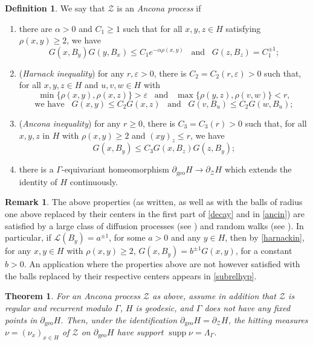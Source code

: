 \documentclass[12pt,a4paper]{amsart}
\newcounter{alph}
\numberwithin{equation}{section}
\newtheorem{thm}[equation]{Theorem}
\theoremstyle{definition}
\newtheorem{dfn}[equation]{Definition}
\newtheorem{rem}[equation]{Remark}
\DeclareMathOperator{\geo}{geo}
\DeclareMathOperator{\supp}{supp}
\def\ve{\varepsilon}
\begin{document}
\begin{dfn}\label{Proc}
We say that $\mathcal{Z}$ is an \emph{Ancona process} if 
\begin{enumerate}[leftmargin=*, label=(A\arabic*)]
\item\label{decay}
there are $\alpha>0$ and $C_1\ge 1$ such that for all $x,y,z\in H$ satisfying $\rho(x,y) \geq 2$, we have
\begin{equation*}
    G(x,B_y)G(y,B_x)\le C_1 e^{-\alpha \rho(x,y)}
    \;\;\;\text{and}\;\;\; G(z,B_z) = C_1^{\pm1};
\end{equation*}
\item\label{harnackin}
(\emph{Harnack inequality})
for any $r,\ve>0$, there is $C_2=C_2(r,\ve)>0$ such that, for all $x,y,z\in H$ and $u,v,w\in H$ with 
\[\min\{\rho(x,y),\rho(x,z)\}>\ve\;\;\;\text{and}\;\;\; \max\{\rho(y,z),\rho(v,w)\}<r,\] 
\[\text{we have}\;\;\; G(x,y)\leq C_2 G(x,z)\;\;\;\text{and}\;\;\; G(v,B_u)\leq C_2 G(w,B_u);\]
\item\label{ancin}
(\emph{Ancona inequality})
for any $r\geq 0$, there is $C_3=C_3(r)>0$ such that, for all $x,y,z$ in $H$ with $\rho(x,y)\geq 2$ and $(xy)_z\le r$, we have 
\begin{equation*}
    G(x,B_y)\leq  C_3 G(x,B_z) G(z,B_y);
\end{equation*}
\item\label{geomar}there is a $\Gamma$-equivariant homeomorphism $\partial_{\geo}H\to\partial_{\mathcal Z}H$ which extends the identity of $H$ continuously.
\end{enumerate}
\end{dfn}

\begin{rem}
The above properties (as written, as well as with the balls of radius one above replaced by their centers in the first part of \ref{decay} and in \ref{ancin}) are satisfied by a large class of diffusion processes (see \cite{An}) and random walks (see \cite{An1, BHM, Gou}).
In particular, if $\mathcal L(B_y)=a^{\pm 1}$, for some $a>0$ and any $y\in H$, then by \ref{harnackin}, for any $x,y\in H$ with $\rho(x,y)\geq 2$, $G(x,B_y)=b^{\pm 1}G(x,y)$, for a constant $b>0$.  An application where the properties above are not however satisfied with the balls replaced by their respective centers appears in \cref{subrelhyp}.
\end{rem}

\begin{thm}\label{suppc}
For an Ancona process $\mathcal Z$ as above, assume in addition that $\mathcal{Z}$ is regular and recurrent modulo $\Gamma$, $H$ is geodesic, and $\Gamma$ does not have any fixed points in $\partial_{\geo}H$.
Then, under the identification $\partial_{\geo}H=\partial_{\mathcal Z}H$, the hitting measures $\nu=(\nu_x)_{x\in H}$ of $\mathcal{Z}$ on $\partial_{\geo}H$ have support $\supp\nu=\Lambda_\Gamma$.
\end{thm}
\end{document}
